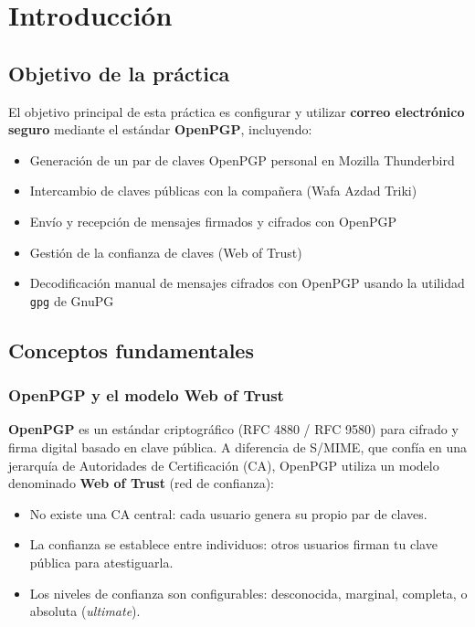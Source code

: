 \chapter{Introducción}

\section{Objetivo de la práctica}

El objetivo principal de esta práctica es configurar y utilizar \textbf{correo electrónico seguro} mediante el estándar \textbf{OpenPGP}, incluyendo:

\begin{itemize}[label=\textbullet]
    \item Generación de un par de claves OpenPGP personal en Mozilla Thunderbird
    \item Intercambio de claves públicas con la compañera (Wafa Azdad Triki)
    \item Envío y recepción de mensajes firmados y cifrados con OpenPGP
    \item Gestión de la confianza de claves (Web of Trust)
    \item Decodificación manual de mensajes cifrados con OpenPGP usando la utilidad \texttt{gpg} de GnuPG
\end{itemize}

\section{Conceptos fundamentales}

\subsection{OpenPGP y el modelo Web of Trust}

\textbf{OpenPGP} es un estándar criptográfico (RFC 4880 / RFC 9580) para cifrado y firma digital basado en clave pública. A diferencia de S/MIME, que confía en una jerarquía de Autoridades de Certificación (CA), OpenPGP utiliza un modelo denominado \textbf{Web of Trust} (red de confianza):

\begin{itemize}[label=\textbullet]
    \item No existe una CA central: cada usuario genera su propio par de claves.
    \item La confianza se establece entre individuos: otros usuarios firman tu clave pública para atestiguarla.
    \item Los niveles de confianza son configurables: desconocida, marginal, completa, o absoluta (\textit{ultimate}).
\end{itemize}

